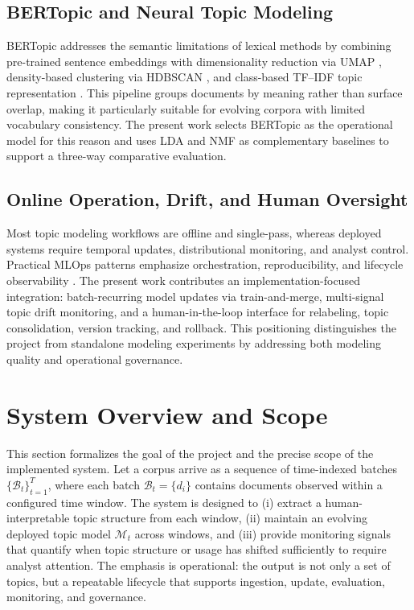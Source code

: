 \documentclass[conference]{IEEEtran}
\newcommand{\bertopic}{BERTopic\xspace}
\newcommand{\lda}{LDA\xspace}
\newcommand{\nmf}{NMF\xspace}
\begin{document}
\subsection{BERTopic and Neural Topic Modeling}
\bertopic addresses the semantic limitations of lexical methods by combining pre-trained sentence embeddings \cite{sentencetransformers} with dimensionality reduction via UMAP \cite{umap}, density-based clustering via HDBSCAN \cite{hdbscan}, and class-based TF--IDF topic representation \cite{bertopic}\cite{Pavithra2024TopicMF}. This pipeline groups documents by meaning rather than surface overlap, making it particularly suitable for evolving corpora with limited vocabulary consistency. The present work selects \bertopic as the operational model for this reason and uses \lda and \nmf as complementary baselines to support a three-way comparative evaluation.

\subsection{Online Operation, Drift, and Human Oversight}
Most topic modeling workflows are offline and single-pass, whereas deployed systems require temporal updates, distributional monitoring, and analyst control. Practical MLOps patterns emphasize orchestration, reproducibility, and lifecycle observability \cite{prefect,mlflow}. The present work contributes an implementation-focused integration: batch-recurring model updates via train-and-merge, multi-signal topic drift monitoring, and a human-in-the-loop interface for relabeling, topic consolidation, version tracking, and rollback. This positioning distinguishes the project from standalone modeling experiments by addressing both modeling quality and operational governance.

\section{System Overview and Scope}
This section formalizes the goal of the project and the precise scope of the implemented system. Let a corpus arrive as a sequence of time-indexed batches \(\{\mathcal{B}_t\}_{t=1}^{T}\), where each batch \(\mathcal{B}_t=\{d_i\}\) contains documents observed within a configured time window. The system is designed to (i) extract a human-interpretable topic structure from each window, (ii) maintain an evolving deployed topic model \(\mathcal{M}_t\) across windows, and (iii) provide monitoring signals that quantify when topic structure or usage has shifted sufficiently to require analyst attention. The emphasis is operational: the output is not only a set of topics, but a repeatable lifecycle that supports ingestion, update, evaluation, monitoring, and governance.
\end{document}
